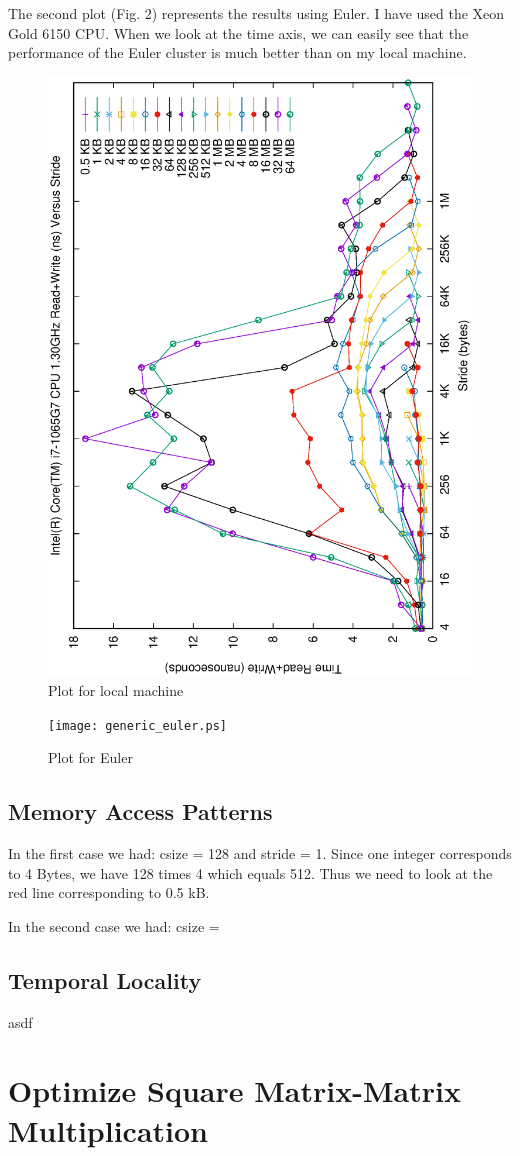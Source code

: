 \documentclass[unicode,11pt,a4paper,oneside,numbers=endperiod,openany]{scrartcl}
\begin{document}
The second plot (Fig. 2) represents the results using Euler. I have used the Xeon Gold 6150 CPU.
When we look at the time axis, we can easily see that the performance of the Euler cluster is much better than on my local machine.
\begin{figure}[h!]
    \centering
    \includegraphics{../membench/generic.ps}
    \caption{Plot for local machine}
\end{figure}
\begin{figure}[h!]
    \centering
    \texttt{[image: generic\_euler.ps]}
    \caption{Plot for Euler}
\end{figure}

\subsection{Memory Access Patterns}
In the first case we had: csize = 128 and stride = 1. Since one integer corresponds to 4 Bytes, we have 128 times 4 which equals 512. Thus we need to look at the red line corresponding to 0.5 kB.

In the second case we had: csize = 

\subsection{Temporal Locality}
asdf


\section{Optimize Square Matrix-Matrix Multiplication  }
\end{document}
